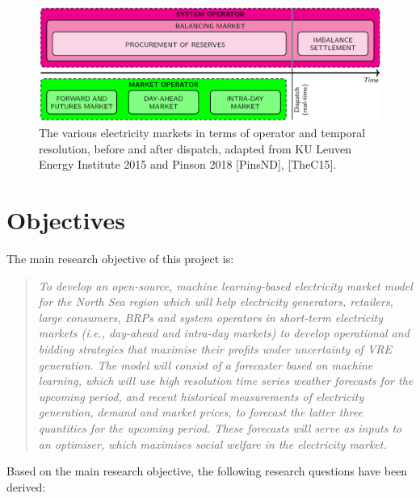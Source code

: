 \begin{figure}
\centering
\includegraphics{images/market-resolution.png}
\caption{The various electricity markets in terms of operator and
temporal resolution, before and after dispatch, adapted from KU Leuven
Energy Institute 2015 and Pinson 2018 {[}PinsND{]}, {[}TheC15{]}.}
\end{figure}

\hypertarget{objectives}{%
\section{Objectives}\label{objectives}}

The main research objective of this project is:

\begin{quote}
\emph{To develop an open-source, machine learning-based electricity
market model for the North Sea region which will help electricity
generators, retailers, large consumers, BRPs and system operators in
short-term electricity markets (i.e., day-ahead and intra-day markets)
to develop operational and bidding strategies that maximise their
profits under uncertainty of VRE generation. The model will consist of a
forecaster based on machine learning, which will use high resolution
time series weather forecasts for the upcoming period, and recent
historical measurements of electricity generation, demand and market
prices, to forecast the latter three quantities for the upcoming period.
These forecasts will serve as inputs to an optimiser, which maximises
social welfare in the electricity market.}
\end{quote}

Based on the main research objective, the following research questions
have been derived:

